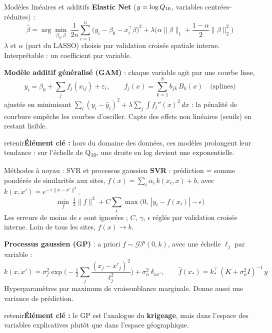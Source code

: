 \documentclass[aspectratio=169,10pt]{beamer}
\newcommand{\retenir}[1]{\vfill\begin{beamercolorbox}[sep=5pt,rounded=true]{retenir}\small\textbf{Élément clé :} #1\end{beamercolorbox}}
\newcommand{\Qdix}{Q\textsubscript{10}}
\begin{document}
\begin{frame}{Modèles linéaires et additifs}
  \small
  \textbf{Elastic Net} ($y=\log\Qdix$, variables centrées-réduites) :
  \[ \hat\beta = \arg\min_{\beta_0,\beta}\ \frac{1}{2n}\sum_{i=1}^n\big(y_i-\beta_0-x_i^\top\beta\big)^2 + \lambda\Big(\alpha\|\beta\|_1+\frac{1-\alpha}{2}\|\beta\|_2^2\Big) \]
  $\lambda$ et $\alpha$ (part du LASSO) choisis par validation croisée spatiale interne. Interprétable : un coefficient par variable.

  \vspace{0.3cm}
  \textbf{Modèle additif généralisé (GAM)} : chaque variable agit par une courbe lisse,
  \[ y_i = \beta_0 + \sum_{j} f_j(x_{ij}) + \varepsilon_i, \qquad f_j(x)=\sum_{k=1}^{8} b_{jk}\,B_k(x) \quad\text{(splines)} \]
  ajustée en minimisant $\sum_i (y_i-\hat y_i)^2 + \lambda \sum_j \int f_j''(x)^2\,dx$ : la pénalité de courbure empêche les courbes d'osciller. Capte des effets non linéaires (seuils) en restant lisible.
  \retenir{hors du domaine des données, ces modèles prolongent leur tendance : sur l'échelle de \Qdix{}, une droite en log devient une exponentielle.}
\end{frame}

\begin{frame}{Méthodes à noyau : SVR et processus gaussien}
  \small
  \textbf{SVR} : prédiction = somme pondérée de similarités aux sites, $f(x)=\sum_i \alpha_i\,k(x_i,x)+b$, avec $k(x,x')=e^{-\gamma\|x-x'\|^2}$.
  \[ \min_{f}\ \tfrac12\|f\|^2 + C\sum_i \max\big(0,\ |y_i-f(x_i)|-\epsilon\big) \]
  Les erreurs de moins de $\epsilon$ sont ignorées ; $C$, $\gamma$, $\epsilon$ réglés par validation croisée interne. Loin de tous les sites, $f(x)\to b$.

  \vspace{0.3cm}
  \textbf{Processus gaussien (GP)} : a priori $f\sim\mathcal{GP}(0,k)$, avec une échelle $\ell_j$ par variable :
  \[ k(x,x') = \sigma_f^2\exp\Big(-\tfrac12\sum_j\frac{(x_j-x'_j)^2}{\ell_j^2}\Big)+\sigma_n^2\,\delta_{xx'}, \qquad \hat f(x_*) = k_*^\top\,(K+\sigma_n^2 I)^{-1}\,y \]
  Hyperparamètres par maximum de vraisemblance marginale. Donne aussi une variance de prédiction.
  \retenir{le GP est l'analogue du \textbf{krigeage}, mais dans l'espace des variables explicatives plutôt que dans l'espace géographique.}
\end{frame}
\end{document}
